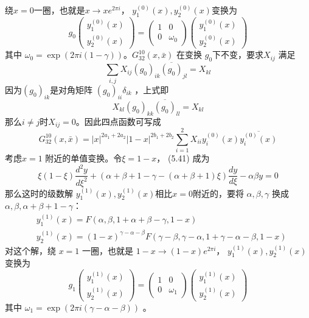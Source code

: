 绕$ x=0$一圈，也就是$x \rightarrow x e^{2 \pi i} $， $y_{1}^{(0)}(x), y_{2}^{(0)}(x) $变换为
\begin{equation}
	g_{0}\left(\begin{array}{c} y_{1}^{(0)}(x) \\ y_{2}^{(0)}(x) \end{array}\right)=\left(\begin{array}{cc} 1 & 0 \\ 0 & \omega_{0} \end{array}\right)\left(\begin{array}{l} y_{1}^{(0)}(x) \\ y_{2}^{(0)}(x) \end{array}\right)
\end{equation} 
其中 $\omega_{0}=\exp (2 \pi i(1-\gamma)) $。$ G_{32}^{10}(x, \bar{x})$ 在变换 $g_0 $下不变，要求$ X_{i j}$ 满足
$$
\sum_{i, j} X_{i j}\left(g_{0}\right)_{i k} \overline{\left(g_{0}\right)}_{j l}=X_{k l}
$$
因为$ \left(g_{0}\right)_{i k} $是对角矩阵 $\left(g_{0}\right)_{i i} \delta_{i k}$ ，上式即
$$
		X_{k l}\left(g_{0}\right)_{k k} \overline{\left(g_{0}\right)}_{l l}=X_{k l} 
$$
那么$i\neq j $时$X_{ij}=0 $。因此四点函数可写成
\begin{equation}
	G_{32}^{10}(x, \bar{x})=|x|^{2 a_{1}+2 a_{2}}|1-x|^{2 b_{1}+2 b_{2}} \sum_{i=1}^{2} X_{i i} y_{i}^{(0)}(x) \overline{y_{i}^{(0)}(x)} 
\end{equation}
考虑$x=1$ 附近的单值变换。令$\xi=1-x $， (5.41) 成为
\begin{equation}
	\xi(1-\xi) \frac{d^{2} y}{d \xi^{2}}+(\alpha+\beta+1-\gamma-(\alpha+\beta+1) \xi) \frac{d y}{d \xi}-\alpha \beta y=0
\end{equation} 
那么这时的级数解 $y_{1}^{(1)}(x), y_{2}^{(1)}(x) $相比$ x=0 $附近的，要将 $\alpha,\beta,\gamma$ 换成 $\alpha,\beta,\alpha+\beta+1-\gamma $：
\begin{equation}
	\begin{aligned} &y_{1}^{(1)}(x)=F(\alpha, \beta, 1+\alpha+\beta-\gamma, 1-x) \\ &y_{2}^{(1)}(x)=(1-x)^{\gamma-\alpha-\beta} F(\gamma-\beta, \gamma-\alpha, 1+\gamma-\alpha-\beta, 1-x) \end{aligned}
\end{equation}
对这个解，绕 $x=1$ 一圈，也就是 $1-x \rightarrow(1-x) e^{2 \pi i} $， $y_{1}^{(1)}(x), y_{2}^{(1)}(x)$ 变换为
\begin{equation}
	g_{1}\left(\begin{array}{c} y_{1}^{(1)}(x) \\ y_{2}^{(1)}(x) \end{array}\right)=\left(\begin{array}{cc} 1 & 0 \\ 0 & \omega_{1} \end{array}\right)\left(\begin{array}{l} y_{1}^{(1)}(x) \\ y_{2}^{(1)}(x) \end{array}\right)
\end{equation} 
其中 $\omega_{1}=\exp (2 \pi i(\gamma-\alpha-\beta))$ 。

